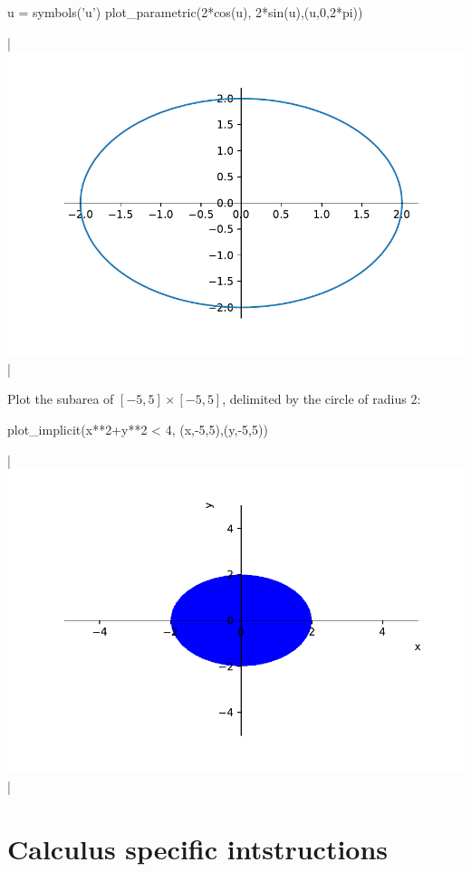 \begin{example}
\begin{pyin}
    u = symbols('u')
    plot_parametric(2*cos(u), 2*sin(u),(u,0,2*pi))
\end{pyin}
\begin{pyout}
    |\includegraphics{figures/Sympy/fig_sympy_7.pdf}|
\end{pyout}

	Plot the subarea of  $[-5,5]\times[-5,5]$, delimited by the circle of radius 2:
	
\begin{pyin}
    plot_implicit(x**2+y**2 < 4, (x,-5,5),(y,-5,5))
\end{pyin}
\begin{pyout}
    |\includegraphics{figures/Sympy/fig_sympy_8.pdf}|
\end{pyout}
\end{example}


\section{Calculus specific intstructions}\label{sec:SympyAnalyse}

